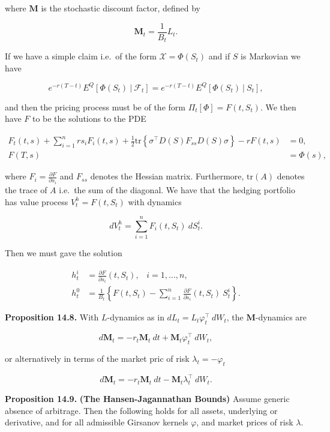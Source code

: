 \documentclass[
]{article}
\begin{document}
where \(\mathbf{M}\) is the stochastic discount factor, defined by

\[
\mathbf{M}_t=\frac{1}{B_t}L_t.
\]

If we have a simple claim i.e.~of the form \(\mathcal{X}=\Phi(S_t)\) and
if \(S\) is Markovian we have

\[
e^{-r(T-t)}E^Q[\Phi(S_t)\ \vert\ \mathcal{F}_t]=e^{-r(T-t)}E^Q[\Phi(S_t)\ \vert\ S_t],
\]

and then the pricing process must be of the form
\(\Pi_t[\Phi]=F(t,S_t)\). We then have \(F\) to be the solutions to the
PDE

\begin{align*}
F_t(t,s)+\sum_{i=1}^nrs_iF_i(t,s)+\frac{1}{2}\text{tr}\left\{\sigma^\top D(S)F_{ss}D(S)\sigma\right\}-rF(t,s)&=0,\\
F(T,s)&=\Phi(s),
\end{align*}

where \(F_i=\frac{\partial F}{\partial s_i}\) and \(F_{ss}\) denotes the
Hessian matrix. Furthermore, \(\text{tr}(A)\) denotes the trace of \(A\)
i.e.~the sum of the diagonal. We have that the hedging portfolio has
value process \(V_t^h=F(t,S_t)\) with dynamics

\[
dV_t^h=\sum_{i=1}^n F_i(t,S_t)\ dS_t^i.
\]

Then we must gave the solution

\begin{align*}
h_t^i&=\frac{\partial F}{\partial s_i}(t,S_t),\hspace{10pt}i=1,...,n,\\
h_t^0&=\frac{1}{B_t}\left\{F(t,S_t)-\sum_{i=1}^n \frac{\partial F}{\partial s_i}(t,S_t)\ S_t^i\right\}.
\end{align*}

\textbf{Proposition 14.8.} With \(L\)-dynamics as in
\(dL_t=L_t\varphi^\top_t\ dW_t\), the \(\mathbf{M}\)-dynamics are

\[
d\mathbf{M}_t=-r_t\mathbf{M}_t\ dt+\mathbf{M}_t\varphi_t^\top\ dW_t,
\]

or alternatively in terms of the market pric of risk
\(\lambda_t=-\varphi_t\)

\[
d\mathbf{M}_t=-r_t\mathbf{M}_t\ dt-\mathbf{M}_t\lambda_t^\top\ dW_t.
\]

\textbf{Proposition 14.9.} \textbf{(The Hansen-Jagannathan Bounds)}
Assume generic absence of arbitrage. Then the following holds for all
assets, underlying or derivative, and for all admissible Girsanov
kernels \(\varphi\), and market prices of risk \(\lambda\).
\end{document}
